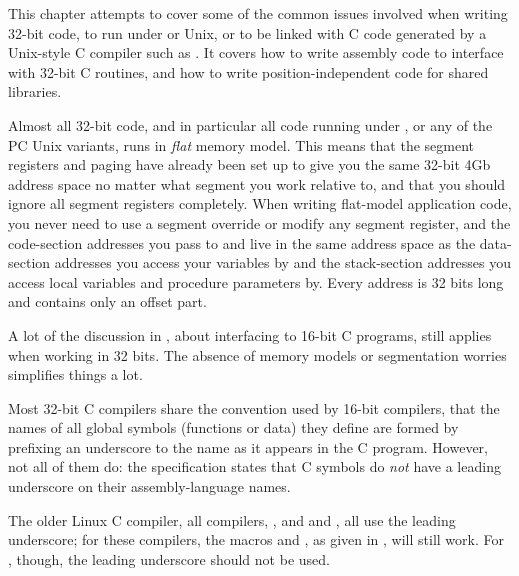 %
%

This chapter attempts to cover some of the common issues involved
when writing 32-bit code, to run under  or Unix,
or to be linked with C code generated by a Unix-style C compiler such as
. It covers how to write assembly code to interface with
32-bit C routines, and how to write position-independent code for
shared libraries.

Almost all 32-bit code, and in particular all code running under
,  or any of the PC Unix variants, runs in
\emph{flat} memory model. This means that
the segment registers and paging have already been set up to give
you the same 32-bit 4Gb address space no matter what segment you
work relative to, and that you should ignore all segment registers
completely. When writing flat-model application code, you never
need to use a segment override or modify any segment register,
and the code-section addresses you pass to  and
 live in the same address space as the data-section addresses
you access your variables by and the stack-section addresses you access
local variables and procedure parameters by. Every address is 32 bits
long and contains only an offset part.


A lot of the discussion in , about interfacing to
16-bit C programs, still applies when working in 32 bits. The absence of
memory models or segmentation worries simplifies things a lot.


Most 32-bit C compilers share the convention used by 16-bit
compilers, that the names of all global symbols (functions or data)
they define are formed by prefixing an underscore to the name as it
appears in the C program. However, not all of them do: the 
specification states that C symbols do \emph{not} have a leading
underscore on their assembly-language names.

The older Linux  C compiler, all  compilers,
, and  and , all use the leading
underscore; for these compilers, the macros  and
, as given in , will still work.
For , though, the leading underscore should not be used.

